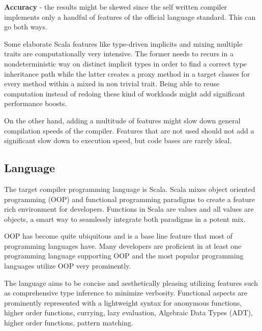 \documentclass{VUMIFPSbakalaurinis}
\begin{document}
\textbf{Accuracy} - the results might be skewed since the self written compiler implements only a handful of features of the official language standard.
This can go both ways.

Some elaborate Scala features like type-driven implicits and mixing multiple traits are computationally very intensive.
The former needs to recurs in a nondeterministic way on distinct implicit types in order to find a correct type inheritance path while the latter creates a proxy method in a target classes for every method within a mixed in non trivial trait.
Being able to reuse computation instead of redoing these kind of workloads might add significant performance boosts.

On the other hand, adding a multitude of features might slow down general compilation speeds of the compiler.
Features that are not used should not add a significant slow down to execution speed, but code bases are rarely ideal.

\subsection{Language}
The target compiler programming language is Scala.
Scala mixes object oriented programming (OOP)  and functional programming paradigms to create a feature rich environment for developers.
Functions in Scala are values and all values are objects, a smart way to seamlessly integrate both paradigms in a potent mix.

OOP has become quite ubiquitous and is a base line feature that most of programming languages have.
Many developers are proficient in at least one programming language supporting OOP and the most popular programming languages utilize OOP very prominently.

The language aims to be concise and aesthetically pleasing utilizing features such as comprehensive type inference to minimize verbosity.
Functional aspects are prominently represented with a lightweight syntax for anonymous functions, higher order functions, currying, lazy evaluation, Algebraic Data Types (ADT), higher order functions, pattern matching.
\end{document}
